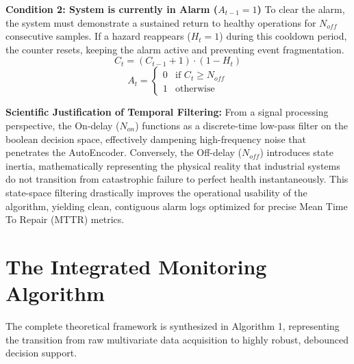 \documentclass[journal]{IEEEtran}
\begin{document}
	\textbf{Condition 2: System is currently in Alarm ($A_{t-1} = 1$)}
	To clear the alarm, the system must demonstrate a sustained return to healthy operations for $N_{off}$ consecutive samples. If a hazard reappears ($H_t = 1$) during this cooldown period, the counter resets, keeping the alarm active and preventing event fragmentation.
	\begin{equation}
		C_t = (C_{t-1} + 1) \cdot (1 - H_t)
	\end{equation}
	\begin{equation}
		A_t = 
		\begin{cases}
			0 & \text{if } C_t \ge N_{off} \\
			1 & \text{otherwise}
		\end{cases}
	\end{equation}
	
	
	
	\textbf{Scientific Justification of Temporal Filtering:} 
	From a signal processing perspective, the On-delay ($N_{on}$) functions as a discrete-time low-pass filter on the boolean decision space, effectively dampening high-frequency noise that penetrates the AutoEncoder. Conversely, the Off-delay ($N_{off}$) introduces state inertia, mathematically representing the physical reality that industrial systems do not transition from catastrophic failure to perfect health instantaneously. This state-space filtering drastically improves the operational usability of the algorithm, yielding clean, contiguous alarm logs optimized for precise Mean Time To Repair (MTTR) metrics.
	
	\section{The Integrated Monitoring Algorithm}
	The complete theoretical framework is synthesized in Algorithm 1, representing the transition from raw multivariate data acquisition to highly robust, debounced decision support.
	
\end{document}
